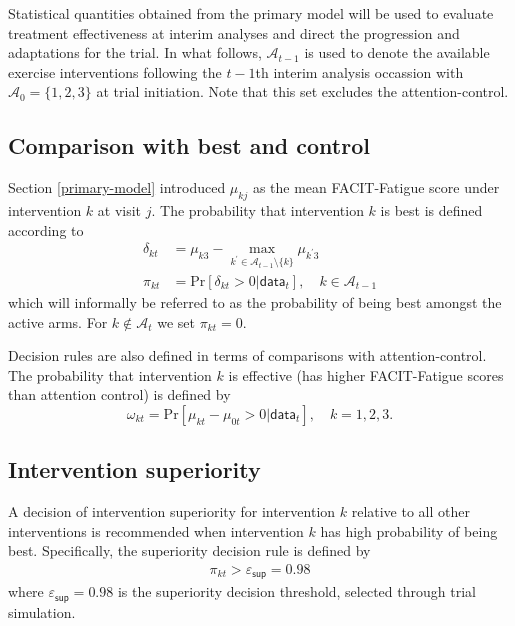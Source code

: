 \documentclass[11pt,parskip=half-]{scrartcl}
\begin{document}
Statistical quantities obtained from the primary model will be used to evaluate treatment effectiveness at interim analyses and direct the progression and adaptations for the trial. In what follows, $\mathcal{A}_{t-1}$ is used to denote the available exercise interventions following the $t-1$th interim analysis occassion with $\mathcal{A}_0=\{1,2,3\}$ at trial initiation. Note that this set excludes the attention-control.

\subsection{Comparison with best and control}\label{comparison-wth-best}

Section \ref{primary-model} introduced $\mu_{kj}$ as the mean FACIT-Fatigue score under intervention $k$ at visit $j$. The probability that intervention $k$ is best is defined according to
$$
  \begin{aligned}
    \delta_{kt} & = \mu_{k3} - \underset{k^\prime\in\mathcal{A}_{t-1}\setminus\{k\}}{\max}\mu_{k^\prime 3} \\
    \pi_{kt}    & = \text{Pr}[\delta_{kt}>0|\mathsf{data}_t], \quad k \in \mathcal{A}_{t-1}
  \end{aligned}
$$
which will informally be referred to as the probability of being best amongst the active arms. For $k\notin\mathcal{A}_t$ we set $\pi_{kt}=0$.

Decision rules are also defined in terms of comparisons with attention-control. The probability that intervention $k$ is effective (has higher FACIT-Fatigue scores than attention control) is defined by
$$
  \omega_{kt} = \text{Pr}[\mu_{kt} - \mu_{0t} > 0 | \mathsf{data}_t], \quad k =1,2,3.
$$

\subsection{Intervention superiority}\label{intervention-superiority}

A decision of intervention superiority for intervention $k$ relative to all other interventions is recommended when intervention $k$ has high probability of being best. Specifically, the superiority decision rule is defined by
$$
  \begin{aligned}
    \pi_{kt} > \varepsilon_{\mathsf{sup}} = 0.98
  \end{aligned}
$$
where $\varepsilon_{\mathsf{sup}} = 0.98$ is the superiority decision threshold, selected through trial simulation.
\end{document}
